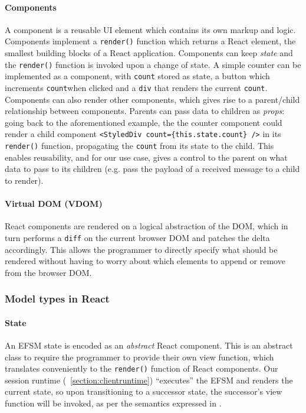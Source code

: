 \documentclass[submission,copyright,creativecommons]{eptcs}
\newcommand{\sectionref}[1]{\textsection~\ref{#1}}
\begin{document}
\paragraph{Components} A component is a reusable UI element which
contains its own markup and logic. Components implement a
\texttt{render()} function which returns a React element, the smallest
building blocks of a React application. Components can keep
\textit{state} and the \texttt{render()} function is invoked upon a
change of state. A simple counter can be implemented as a component,
with \texttt{count} stored as state, a button which increments \texttt{count}when clicked and a \texttt{div} that renders the current
\texttt{count}. Components can also render other components, which gives rise
to a parent/child relationship between components. Parents can pass
data to children as \textit{props}: going back to the aforementioned
example, the the counter component could render a child component
\texttt{<StyledDiv count=\{this.state.count\} />} in its
\texttt{render()} function, propagating the \texttt{count} from its
state to the child. This enables reusability, and for our use case,
gives a control to the parent on what data to pass to its children (e.g. pass the payload of a received message to a child to render).

\paragraph{Virtual DOM (VDOM)} React components are rendered on a logical abstraction of the DOM, which in turn performs a \texttt{diff} on the current browser DOM and patches the delta accordingly. This allows the programmer to directly specify what should be rendered without having to worry about which elements to append or remove from the browser DOM.

\subsubsection{Model types in React}

\paragraph{State} An EFSM state is encoded as an \textit{abstract} React component. This is an abstract class to require the programmer to provide their own view function, which translates conveniently to the \texttt{render()} function of React components. Our session runtime (\sectionref{section:clientruntime}) ``executes'' the EFSM and renders the current state, so upon transitioning to a successor state, the successor's view function will be invoked, as per the semantics expressed in \cite{MVU2019}.
\end{document}
